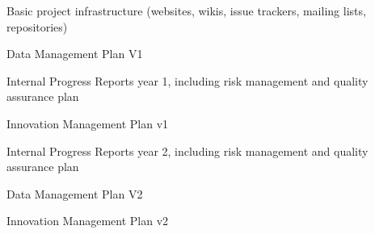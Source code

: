 \begin{workpackage}
\begin{wpdelivs}
\begin{wpdeliv}[due=1,miles=startup,id=infrastructure,dissem=PU,nature=DEC,lead=PS,issue=17]
  Basic project infrastructure (websites, wikis, issue trackers, mailing lists, repositories)
\end{wpdeliv}
\begin{wpdeliv}[due=6,miles=startup,id=data-plan1,dissem=PU,nature=R,lead=PS,issue=18]
  Data Management Plan V1
\end{wpdeliv}
\begin{wpdeliv}[due=12,miles=startup,lead=PS,id=ipr,dissem=CO,nature=R,issue=19]
  Internal Progress Reports year 1, including risk management and quality assurance plan
\end{wpdeliv}
\begin{wpdeliv}[due=18,miles=proto1,lead=PS,id=tickets,dissem=CO,nature=R,issue=20]
  Innovation Management Plan v1
\end{wpdeliv}
\begin{wpdeliv}[due=36,miles=community,lead=PS,id=ipr2,dissem=CO,nature=R,issue=21]
  Internal Progress Reports year 2, including risk management and quality assurance plan
\end{wpdeliv}
\begin{wpdeliv}[due=36,miles=community,id=data-plan2,dissem=PU,nature=R,lead=PS,issue=22]
  Data Management Plan V2
\end{wpdeliv}
\begin{wpdeliv}[due=45,lead=PS,miles=eval,id=tickets,dissem=CO,nature=R,issue=23]
  Innovation Management Plan v2
\end{wpdeliv}


\end{wpdelivs}
\end{workpackage}

